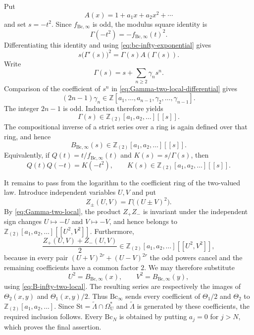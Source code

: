 \documentclass[14pt,dvipsnames]{extarticle}
\makeatletter
\numberwithin{equation}{subsection}
\theoremstyle{plain}
\theoremstyle{definition}
\theoremstyle{definition}
\renewenvironment{proof}[1][\proofname]{
 \par\pushQED{\qed}\normalfont
 \topsep6\p@\@plus6\p@\relax
 \trivlist\item[\hskip\labelsep\bfseries\itshape #1\@addpunct{.}]
}{\popQED\endtrivlist\@endpefalse}
\newcommand{\OmU}{\Omega_{\mathrm U}^{\ast}}
\newcommand{\Bc}{\mathrm{Bc}}
\newcommand{\St}{\mathrm{St}}
\newcommand{\Ztwo}{\mathbb{Z}_{(2)}}
\makeatother
\begin{document}
\begin{proof}[Proof of \cref{thm:bc-infty-two-local}]
Put
\[
 A(x)=1+a_1x+a_2x^2+\cdots
\]
and set $s=-t^2$. Since $f_{\Bc,\infty}$ is odd, the modulus square identity is
\[
 \Gamma(-t^2)=-f_{\Bc,\infty}(t)^2.
\]
Differentiating this identity and using
\eqref{eq:bc-infty-exponential} gives
\begin{equation}\label{eq:Gamma-two-local-differential}
 s\bigl(\Gamma'(s)\bigr)^2
 =\Gamma(s)A(\Gamma(s)).
\end{equation}
Write
\[
 \Gamma(s)=s+\sum_{n\geq2}\gamma_ns^n.
\]
Comparison of the coefficient of $s^n$ in
\eqref{eq:Gamma-two-local-differential} gives
\[
 (2n-1)\gamma_n
 \in
 \mathbb Z[a_1,\ldots,a_{n-1},
            \gamma_2,\ldots,\gamma_{n-1}].
\]
The integer $2n-1$ is odd. Induction therefore yields
\begin{equation}\label{eq:Gamma-two-local}
 \Gamma(s)\in\Ztwo[a_1,a_2,\ldots][[s]].
\end{equation}
The compositional inverse of a strict series over a ring is again defined over
that ring, and hence
\begin{equation}\label{eq:B-infty-two-local}
 B_{\Bc,\infty}(s)
 \in\Ztwo[a_1,a_2,\ldots][[s]].
\end{equation}
Equivalently, if $Q(t)=t/f_{\Bc,\infty}(t)$ and
$K(s)=s/\Gamma(s)$, then
\[
 Q(t)Q(-t)=K(-t^2),
 \qquad
 K(s)\in\Ztwo[a_1,a_2,\ldots][[s]].
\]

It remains to pass from the logarithm to the coefficient ring of the two-valued
law. Introduce independent variables $U,V$ and put
\[
 Z_\pm(U,V)=\Gamma\bigl((U\mathbin{\pm}V)^2\bigr).
\]
By \eqref{eq:Gamma-two-local}, the product $Z_+Z_-$ is invariant under the
independent sign changes $U\mapsto-U$ and $V\mapsto-V$, and hence belongs to
$\Ztwo[a_1,a_2,\ldots][[U^2,V^2]]$. Furthermore,
\[
 \frac{Z_+(U,V)+Z_-(U,V)}{2}
 \in\Ztwo[a_1,a_2,\ldots][[U^2,V^2]],
\]
because in every pair
$(U+V)^{2r}+(U-V)^{2r}$ the odd powers cancel and the remaining coefficients
have a common factor $2$. We may therefore substitute
\[
 U^2=B_{\Bc,\infty}(x),
 \qquad
 V^2=B_{\Bc,\infty}(y),
\]
using \eqref{eq:B-infty-two-local}. The resulting series are respectively the
images of $\Theta_2(x,y)$ and $\Theta_1(x,y)/2$. Thus $\Bc_\infty$ sends every
coefficient of $\Theta_1/2$ and $\Theta_2$ to
$\Ztwo[a_1,a_2,\ldots]$. Since
$\St=\widetilde\Lambda\cap\OmU$ and $\widetilde\Lambda$ is generated by these
coefficients, the required inclusion follows. Every $\Bc_N$ is obtained by
putting $a_j=0$ for $j>N$, which proves the final assertion.
\end{proof}
\end{document}
